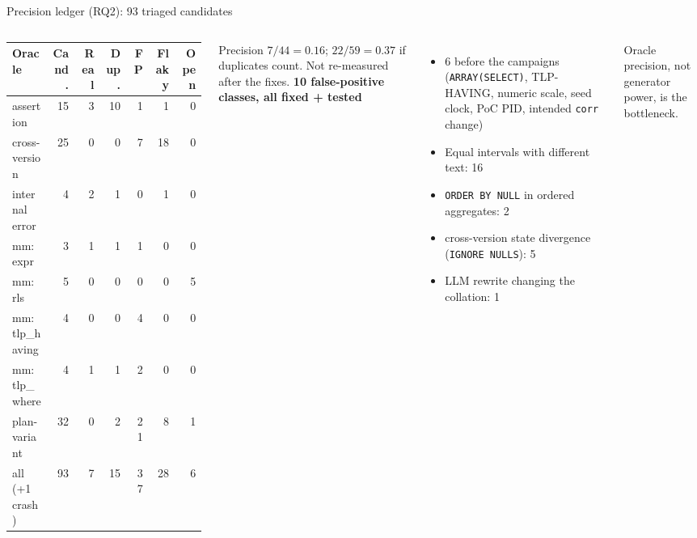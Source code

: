 \documentclass[aspectratio=169,11pt]{beamer}
\begin{document}
\begin{frame}{Precision ledger (RQ2): 93 triaged candidates}
\begin{columns}[T]
\scriptsize\setlength{\tabcolsep}{3pt}
\begin{tabular}{lrrrrrr}
\toprule
Oracle & Cand. & Real & Dup. & FP & Flaky & Open \\
\midrule
assertion & 15 & 3 & 10 & 1 & 1 & 0 \\
cross-version & 25 & 0 & 0 & 7 & 18 & 0 \\
internal error & 4 & 2 & 1 & 0 & 1 & 0 \\
mm: expr & 3 & 1 & 1 & 1 & 0 & 0 \\
mm: rls & 5 & 0 & 0 & 0 & 0 & 5 \\
mm: tlp\_having & 4 & 0 & 0 & 4 & 0 & 0 \\
mm: tlp\_where & 4 & 1 & 1 & 2 & 0 & 0 \\
plan-variant & 32 & 0 & 2 & 21 & 8 & 1 \\
\midrule
all (+1 crash) & 93 & 7 & 15 & 37 & 28 & 6 \\
\bottomrule
\end{tabular}

\scriptsize Precision $7/44=0.16$; $22/59=0.37$ if duplicates count. Not re-measured after the fixes.
\small
\textbf{10 false-positive classes, all fixed + tested}
\begin{itemize}\scriptsize
  \item 6 before the campaigns (\texttt{ARRAY(SELECT)}, TLP-HAVING, numeric scale, seed clock, PoC PID, intended \texttt{corr} change)
  \item \alert{Equal intervals with different text: 16}
  \item \texttt{ORDER BY NULL} in ordered aggregates: 2
  \item cross-version state divergence (\texttt{IGNORE NULLS}): 5
  \item LLM rewrite changing the collation: 1
\end{itemize}
\alert{Oracle precision, not generator power, is the bottleneck.}
\end{columns}
\end{frame}
\end{document}
